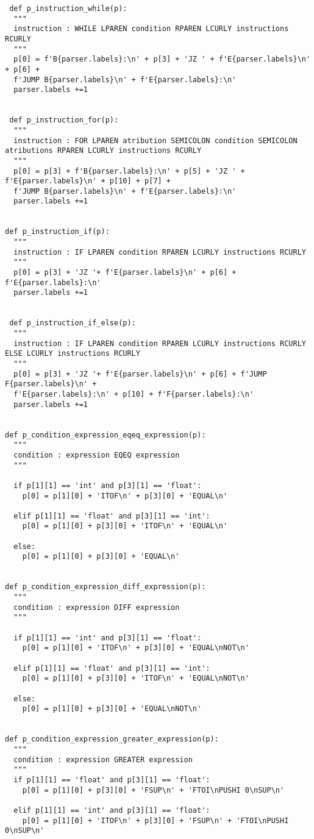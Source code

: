 \documentclass[11pt,a4paper]{report}%
\begin{document}
\begin{scriptsize}
\begin{verbatim}
 def p_instruction_while(p):
  """
  instruction : WHILE LPAREN condition RPAREN LCURLY instructions RCURLY
  """
  p[0] = f'B{parser.labels}:\n' + p[3] + 'JZ ' + f'E{parser.labels}\n' + p[6] + 
  f'JUMP B{parser.labels}\n' + f'E{parser.labels}:\n' 
  parser.labels +=1


 def p_instruction_for(p):
  """
  instruction : FOR LPAREN atribution SEMICOLON condition SEMICOLON atributions RPAREN LCURLY instructions RCURLY
  """
  p[0] = p[3] + f'B{parser.labels}:\n' + p[5] + 'JZ ' + f'E{parser.labels}\n' + p[10] + p[7] + 
  f'JUMP B{parser.labels}\n' + f'E{parser.labels}:\n' 
  parser.labels +=1


def p_instruction_if(p):
  """
  instruction : IF LPAREN condition RPAREN LCURLY instructions RCURLY
  """
  p[0] = p[3] + 'JZ '+ f'E{parser.labels}\n' + p[6] + f'E{parser.labels}:\n' 
  parser.labels +=1


 def p_instruction_if_else(p):
  """
  instruction : IF LPAREN condition RPAREN LCURLY instructions RCURLY ELSE LCURLY instructions RCURLY
  """
  p[0] = p[3] + 'JZ '+ f'E{parser.labels}\n' + p[6] + f'JUMP F{parser.labels}\n' +
  f'E{parser.labels}:\n' + p[10] + f'F{parser.labels}:\n' 
  parser.labels +=1

  
def p_condition_expression_eqeq_expression(p):
  """
  condition : expression EQEQ expression
  """

  if p[1][1] == 'int' and p[3][1] == 'float':
    p[0] = p[1][0] + 'ITOF\n' + p[3][0] + 'EQUAL\n'
  
  elif p[1][1] == 'float' and p[3][1] == 'int':
    p[0] = p[1][0] + p[3][0] + 'ITOF\n' + 'EQUAL\n'

  else:
    p[0] = p[1][0] + p[3][0] + 'EQUAL\n'
  

def p_condition_expression_diff_expression(p):
  """
  condition : expression DIFF expression
  """

  if p[1][1] == 'int' and p[3][1] == 'float':
    p[0] = p[1][0] + 'ITOF\n' + p[3][0] + 'EQUAL\nNOT\n'
  
  elif p[1][1] == 'float' and p[3][1] == 'int':
    p[0] = p[1][0] + p[3][0] + 'ITOF\n' + 'EQUAL\nNOT\n'

  else:
    p[0] = p[1][0] + p[3][0] + 'EQUAL\nNOT\n'


def p_condition_expression_greater_expression(p):
  """
  condition : expression GREATER expression
  """
  if p[1][1] == 'float' and p[3][1] == 'float':
    p[0] = p[1][0] + p[3][0] + 'FSUP\n' + 'FTOI\nPUSHI 0\nSUP\n'

  elif p[1][1] == 'int' and p[3][1] == 'float':
    p[0] = p[1][0] + 'ITOF\n' + p[3][0] + 'FSUP\n' + 'FTOI\nPUSHI 0\nSUP\n'
  

\end{verbatim}
\end{scriptsize}
\end{document}
